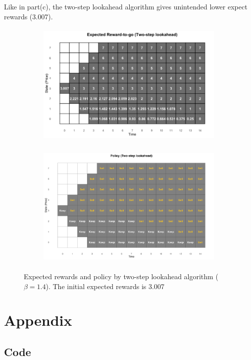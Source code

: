 \documentclass[11pt]{article}
\begin{document}
\begin{enumerate}[label=(\alph*)]
    Like in part(c), the two-step lookahead algorithm gives unintended lower expect rewards (3.007).
    \begin{figure}[h]
    \begin{subfigure}{0.5\textwidth}
    \includegraphics[width=0.9\linewidth, height=6cm]{media/hw2/partd1.png} 
    \label{fig:partd1}
    \end{subfigure}
    \begin{subfigure}{0.5\textwidth}
    \includegraphics[width=0.9\linewidth, height=6cm]{media/hw2/partd2.png}
    \label{fig:partd2}
    \end{subfigure}
    \caption{Expected rewards and policy by two-step lookahead algorithm ($\beta = 1.4$). The initial expected rewards is 3.007}
    \label{fig:partd}
    \end{figure}
\end{enumerate}

\newpage
\section*{Appendix}
\subsection*{Code}


\end{document}
